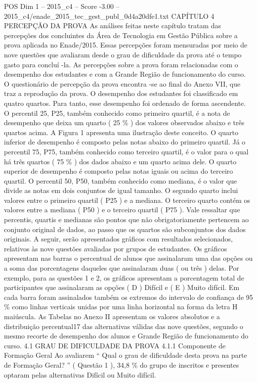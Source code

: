 \begin{textsample}{POS Dim 1 – 2015\_c4 – Score -3.00 – 2015\_c4/enade\_2015\_tec\_gest\_publ\_0d4a20dfe1.txt}  \label{ex:f1_pos_331}
CAPÍTULO 4 PERCEPÇÃO DA PROVA As análises feitas neste capítulo tratam das percepções dos concluintes da Área de Tecnologia em Gestão Pública sobre a prova aplicada no Enade/2015.
Essas percepções foram mensuradas por meio de nove questões que avaliaram desde o grau de dificuldade da prova até o tempo gasto para concluí -la.
As percepções sobre a prova foram relacionadas com o desempenho dos estudantes e com a Grande Região de funcionamento do curso.
O questionário de percepção da prova encontra -se ao final do Anexo VII, que traz a reprodução da prova.
O desempenho dos estudantes foi classificado em quatro quartos.
Para tanto, esse desempenho foi ordenado de forma ascendente.
O percentil 25, P25, também conhecido como primeiro quartil, é a nota de desempenho que deixa um quarto ( 25 \% ) dos valores observados abaixo e três quartos acima.
A Figura 1 apresenta uma ilustração deste conceito.
O quarto inferior de desempenho é composto pelas notas abaixo do primeiro quartil.
Já o percentil 75, P75, também conhecido como terceiro quartil, é o valor para o qual há três quartos ( 75 \% ) dos dados abaixo e um quarto acima dele.
O quarto superior de desempenho é composto pelas notas iguais ou acima do terceiro quartil.
O percentil 50, P50, também conhecido como mediana, é o valor que divide as notas em dois conjuntos de igual tamanho.
O segundo quarto inclui valores entre o primeiro quartil ( P25 ) e a mediana.
O terceiro quarto contém os valores entre a mediana ( P50 ) e o terceiro quartil ( P75 ).
Vale ressaltar que percentis, quartis e medianas são pontos que não obrigatoriamente pertencem ao conjunto original de dados, ao passo que os quartos são subconjuntos dos dados originais.
A seguir, serão apresentados gráficos com resultados selecionados, relativos às nove questões avaliadas por grupos de estudantes.
Os gráficos apresentam nas barras o percentual de alunos que assinalaram uma das opções ou a soma das porcentagens daqueles que assinalaram duas ( ou três ) delas.
Por exemplo, para as questões 1 e 2, os gráficos apresentam a porcentagem total de participantes que assinalaram as opções ( D ) Difícil e ( E ) Muito difícil.
Em cada barra foram assinalados também os extremos do intervalo de confiança de 95 \% como linhas verticais unidas por uma linha horizontal na forma da letra H maiúscula.
As Tabelas no Anexo II apresentam os valores absolutos e a distribuição percentual17 das alternativas válidas das nove questões, segundo o mesmo recorte de desempenho dos alunos e Grande Região de funcionamento do curso. 4.1 GRAU DE DIFICULDADE DA PROVA 4.1.1 Componente de Formação Geral Ao avaliarem “ Qual o grau de dificuldade desta prova na parte de Formação Geral? ” ( Questão 1 ), 34,8 \% do grupo de inscritos e presentes optaram pelas alternativas Difícil ou Muito difícil.

\end{textsample}
